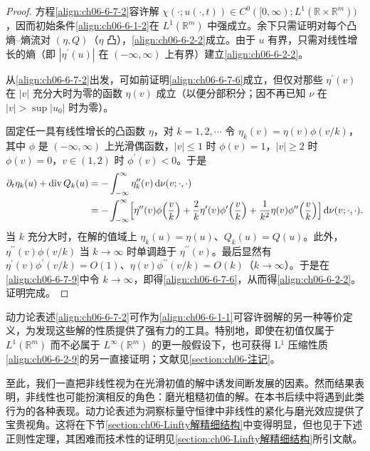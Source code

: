 \documentclass[../../main.tex]{subfiles}
\begin{document}
\begin{proof}
方程\eqref{align:ch06-6-7-2}容许解 $\chi(\cdot;u(\cdot,t))\in C^{0}([0,\infty);L^{1}(\mathbb{R}\times\mathbb{R}^{m}))$，因而初始条件\eqref{align:ch06-6-1-2}在 $L^{1}(\mathbb{R}^{m})$ 中强成立。余下只需证明对每个凸熵--熵流对 $(\eta,Q)$（$\eta$ 凸），\eqref{align:ch06-6-2-2}成立。由于 $u$ 有界，只需对线性增长的熵（即 $|\eta^{\prime}(u)|$ 在 $(-\infty,\infty)$ 上有界）建立\eqref{align:ch06-6-2-2}。

从\eqref{align:ch06-6-7-2}出发，可如前证明\eqref{align:ch06-6-7-6}成立，但仅对那些 $\eta^{\prime}(v)$ 在 $|v|$ 充分大时为零的函数 $\eta(v)$ 成立（以便分部积分；因不再已知 $\nu$ 在 $|v|>\sup|u_{0}|$ 时为零）。

固定任一具有线性增长的凸函数 $\eta$，对 $k=1,2,\cdots$ 令 $\eta_{k}(v)=\eta(v)\phi(v/k)$，其中 $\phi$ 是 $(-\infty,\infty)$ 上光滑偶函数，$|v|\leqslant 1$ 时 $\phi(v)=1$，$|v|\geqslant 2$ 时 $\phi(v)=0$，$v\in(1,2)$ 时 $\phi^{\prime}(v)<0$。于是
\begin{align}
\partial_{t}\eta_{k}(u)+\operatorname{div}Q_{k}(u)&=-\int_{-\infty}^{\infty}\eta_{k}^{\prime\prime}(v)\,\mathrm{d}\nu(v;\cdot,\cdot)\notag\\
&=-\int_{-\infty}^{\infty}\Bigl{[}\eta^{\prime\prime}(v)\phi\Bigl{(}\frac{v}{k}\Bigr{)}+\frac{2}{k}\eta^{\prime}(v)\phi^{\prime}\Bigl{(}\frac{v}{k}\Bigr{)}+\frac{1}{k^{2}}\eta(v)\phi^{\prime\prime}\Bigl{(}\frac{v}{k}\Bigr{)}\Bigr{]}\,\mathrm{d}\nu(v;\cdot,\cdot).
\label{align:ch06-6-7-9}
\end{align}
当 $k$ 充分大时，在解的值域上 $\eta_{k}(u)=\eta(u)$、$Q_{k}(u)=Q(u)$。此外，$\eta^{\prime\prime}(v)\phi(v/k)$ 当 $k\to\infty$ 时单调趋于 $\eta^{\prime\prime}(v)$。最后显然有 $\eta^{\prime}(v)\phi^{\prime}(v/k)=O(1)$、$\eta(v)\phi^{\prime\prime}(v/k)=O(k)$（$k\to\infty$）。于是在\eqref{align:ch06-6-7-9}中令 $k\to\infty$，即得\eqref{align:ch06-6-7-6}，从而得\eqref{align:ch06-6-2-2}。证明完成。
\end{proof}

动力论表述\eqref{align:ch06-6-7-2}可作为\eqref{align:ch06-6-1-1}可容许弱解的另一种等价定义，为发现这些解的性质提供了强有力的工具。特别地，即使在初值仅属于 $L^{1}(\mathbb{R}^{m})$ 而不必属于 $L^{\infty}(\mathbb{R}^{m})$ 的更一般假设下，也可获得 L$^{1}$ 压缩性质\eqref{align:ch06-6-2-9}的另一直接证明；文献见\cref{section:ch06-注记}。


至此，我们一直把非线性视为在光滑初值的解中诱发间断发展的因素。然而结果表明，非线性也可能扮演相反的角色：磨光粗糙初值的解。在本书后续中将遇到此类行为的各种表现。动力论表述为洞察标量守恒律中非线性的紧化与磨光效应提供了宝贵视角。这将在下节\cref{section:ch06-Linfty解精细结构}中变得明显，但也见于下述正则性定理，其困难而技术性的证明见\cref{section:ch06-Linfty解精细结构}所引文献。
\end{document}
